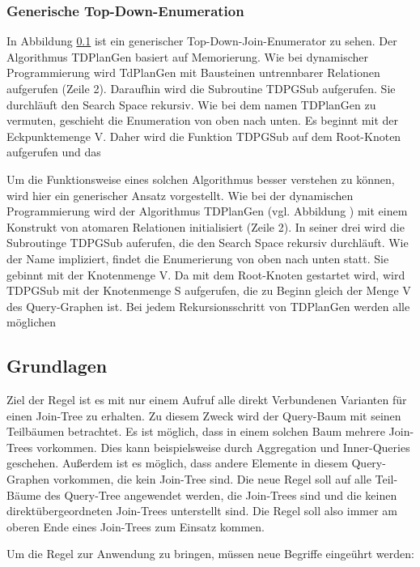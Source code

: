 \subsubsection{Generische Top-Down-Enumeration}

In Abbildung \ref{} ist ein generischer Top-Down-Join-Enumerator zu sehen. Der Algorithmus TDPlanGen basiert auf Memorierung. Wie bei dynamischer Programmierung wird TdPlanGen mit Bausteinen untrennbarer Relationen aufgerufen (Zeile 2). Daraufhin wird die Subroutine TDPGSub aufgerufen. Sie durchläuft den Search Space rekursiv.  Wie bei dem namen TDPlanGen zu vermuten, geschieht die Enumeration von oben nach unten. Es beginnt mit der Eckpunktemenge V. Daher wird die Funktion TDPGSub auf dem Root-Knoten aufgerufen und das




Um die Funktionsweise eines solchen Algorithmus besser verstehen zu können, wird hier ein generischer Ansatz vorgestellt. Wie bei der dynamischen Programmierung wird der Algorithmus TDPlanGen (vgl. Abbildung ) mit einem Konstrukt von atomaren Relationen initialisiert (Zeile 2). In seiner drei wird die Subroutinge TDPGSub auferufen, die den Search Space rekursiv durchläuft.  Wie der Name impliziert, findet die Enumerierung von oben nach unten statt. Sie gebinnt mit der Knotenmenge V. Da mit dem Root-Knoten gestartet wird, wird TDPGSub mit der Knotenmenge S aufgerufen, die zu Beginn gleich der Menge V des Query-Graphen ist. Bei jedem Rekursionsschritt von TDPlanGen werden alle möglichen




\subsection{Grundlagen}
Ziel der Regel ist es mit nur einem Aufruf alle direkt Verbundenen Varianten für einen Join-Tree zu erhalten. Zu diesem Zweck wird der Query-Baum mit seinen Teilbäumen betrachtet. Es ist möglich, dass in einem solchen Baum mehrere Join-Trees vorkommen. Dies kann beispielsweise durch Aggregation und Inner-Queries geschehen. Außerdem ist es möglich, dass andere Elemente in diesem Query-Graphen vorkommen, die kein Join-Tree sind. Die neue Regel soll auf alle Teil-Bäume des Query-Tree angewendet werden, die Join-Trees sind und die keinen direktübergeordneten Join-Trees unterstellt sind. Die Regel soll also immer am oberen Ende eines Join-Trees zum Einsatz kommen.

Um die Regel zur Anwendung zu bringen, müssen neue Begriffe eingeührt werden:

